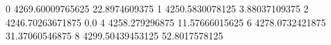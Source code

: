 0 4269.60009765625 22.8974609375
1 4250.5830078125 3.88037109375
2 4246.70263671875 0.0
4 4258.279296875 11.57666015625
6 4278.0732421875 31.37060546875
8 4299.50439453125 52.8017578125
